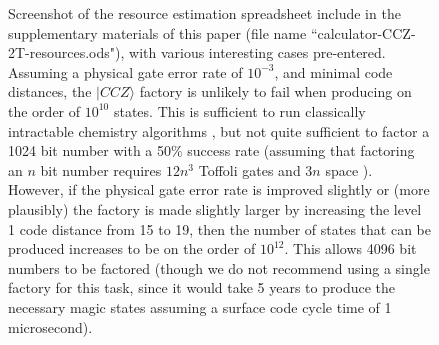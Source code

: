\documentclass[superscriptaddress,notitlepage,longbibliography]{revtex4-1}
\begin{document}
\begin{figure}[ht]
  \label{fig:spreadsheet}
  \caption{
    Screenshot of the resource estimation spreadsheet include in the supplementary materials of this paper (file name ``calculator-CCZ-2T-resources.ods"), with various interesting cases pre-entered.
    Assuming a physical gate error rate of $10^{-3}$, and minimal code distances, the $|CCZ\rangle$ factory is unlikely to fail when producing on the order of $10^{10}$ states.
    This is sufficient to run classically intractable chemistry algorithms \cite{babbush2018}, but not quite sufficient to factor a 1024 bit number with a 50\% success rate (assuming that factoring an $n$ bit number requires $12 n^3$ Toffoli gates and $3n$ space \cite{zalka1998fast}).
    However, if the physical gate error rate is improved slightly or (more plausibly) the factory is made slightly larger by increasing the level 1 code distance from 15 to 19, then the number of states that can be produced increases to be on the order of $10^{12}$.
    This allows 4096 bit numbers to be factored (though we do not recommend using a single factory for this task, since it would take 5 years to produce the necessary magic states assuming a surface code cycle time of 1 microsecond).
  }
\end{figure}
\end{document}
